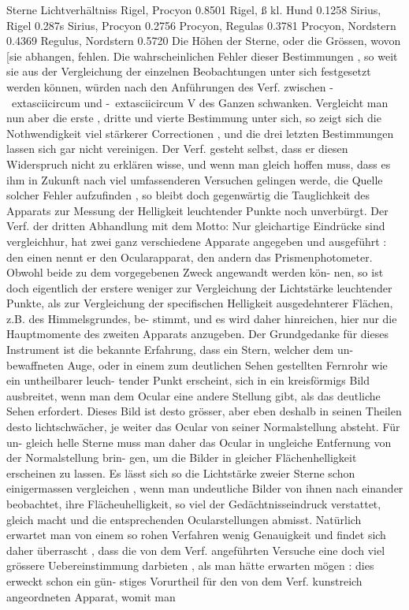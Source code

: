 \documentclass[12pt,a4paper]{article}
\begin{document}
{{{{{{{{Sterne Lichtverhältniss Rigel,  Procyon 0.8501 Rigel,  ß  kl.  Hund 0.1258 Sirius,  Rigel 0.287s Sirius,  Procyon 0.2756 Procyon,  Regulas 0.3781 Procyon,  Nordstern 0.4369 Regulus,  Nordstern 0.5720 Die  Höhen  der  Sterne,  oder  die  Grössen,  wovon  [sie  abhangen,  fehlen.  Die  wahrscheinlichen Fehler  dieser  Bestimmungen ,  so  weit  sie  aus  der  Vergleichung  der  einzelnen  Beobachtungen  unter  sich festgesetzt  werden  können,  würden  nach  den  Anführungen  des  Verf.  zwischen  -\	extasciicircum{}{ }  und  -\	extasciicircum{}{ }V  des  Ganzen schwanken.  Vergleicht  man  nun  aber  die  erste ,  dritte  und  vierte  Bestimmung  unter  sich,  so  zeigt  sich die  Nothwendigkeit  viel  stärkerer  Correctionen ,  und  die  drei  letzten  Bestimmungen  lassen  sich  gar  nicht vereinigen.  Der  Verf.  gesteht  selbst,  dass  er  diesen  Widerspruch  nicht  zu  erklären  wisse,  und  wenn man  gleich  hoffen  muss,  dass  es  ihm  in  Zukunft  nach  viel  umfassenderen  Versuchen  gelingen  werde, die  Quelle  solcher  Fehler  aufzufinden ,  so  bleibt  doch  gegenwärtig  die  Tauglichkeit  des  Apparats  zur Messung  der  Helligkeit  leuchtender  Punkte  noch  unverbürgt. Der  Verf.  der  dritten  Abhandlung  mit  dem  Motto:  Nur  gleichartige  Eindrücke  sind  vergleichhur, hat  zwei  ganz  verschiedene  Apparate  angegeben  und  ausgeführt :  den  einen  nennt  er  den  Ocularapparat, den  andern  das  Prismenphotometer.  Obwohl  beide  zu  dem  vorgegebenen  Zweck  angewandt  werden  kön- nen, so  ist  doch  eigentlich  der  erstere  weniger  zur  Vergleichung  der  Lichtstärke  leuchtender  Punkte, als  zur  Vergleichung  der  specifischen  Helligkeit  ausgedehnterer  Flächen,  z.B.  des  Himmelsgrundes,  be- stimmt, und  es  wird  daher  hinreichen,  hier  nur  die  Hauptmomente  des  zweiten  Apparats  anzugeben. Der  Grundgedanke  für  dieses  Instrument  ist  die  bekannte  Erfahrung,  dass  ein  Stern,  welcher  dem  un- bewaffneten Auge,  oder  in  einem  zum  deutlichen  Sehen  gestellten  Fernrohr  wie  ein  untheilbarer  leuch- tender Punkt  erscheint,  sich  in  ein  kreisförmigs  Bild  ausbreitet,  wenn  man  dem  Ocular  eine  andere Stellung  gibt,  als  das  deutliche  Sehen  erfordert.  Dieses  Bild  ist  desto  grösser,  aber  eben  deshalb  in seinen  Theilen  desto  lichtschwächer,  je  weiter  das  Ocular  von  seiner  Normalstellung  absteht.  Für  un- gleich helle  Sterne  muss  man  daher  das  Ocular  in  ungleiche  Entfernung  von  der  Normalstellung  brin- gen, um  die  Bilder  in  gleicher  Flächenhelligkeit  erscheinen  zu  lassen.  Es  lässt  sich  so  die  Lichtstärke zweier  Sterne  schon  einigermassen  vergleichen ,  wenn  man  undeutliche  Bilder  von  ihnen  nach  einander beobachtet,  ihre  Flächeuhelligkeit,  so  viel  der  Gedächtnisseindruck  verstattet,  gleich  macht  und  die entsprechenden  Ocularstellungen  abmisst.  Natürlich  erwartet  man  von  einem  so  rohen  Verfahren  wenig Genauigkeit  und  findet  sich  daher  überrascht ,  dass  die  von  dem  Verf.  angeführten  Versuche  eine  doch viel  grössere  Uebereinstimmung  darbieten ,  als  man  hätte  erwarten  mögen :  dies  erweckt  schon  ein  gün- stiges Vorurtheil  für  den  von  dem  Verf.  kunstreich  angeordneten  Apparat,  womit  man  }}}}}}}}
\end{document}
